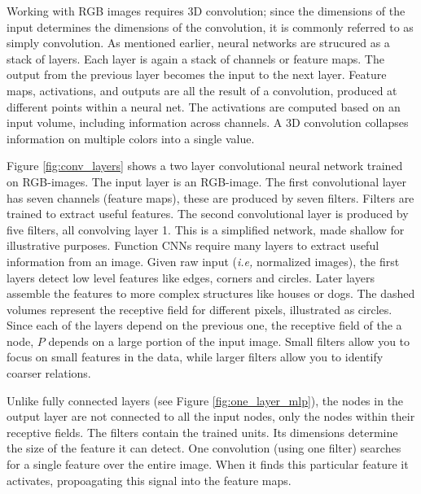 \documentclass{article}
\begin{document}
Working with RGB images requires 3D convolution; since the dimensions of the input determines the dimensions of the convolution, it is commonly referred to as simply convolution. As mentioned earlier, neural networks are strucured as a stack of layers. Each layer is again a stack of channels or feature maps. The output from the previous layer becomes the input to the next layer. Feature maps, activations, and outputs are all the result of a convolution, produced at different points within a neural net. The activations are computed based on an input volume, including information across channels. A 3D convolution collapses information on multiple colors into a single value.

Figure \ref{fig:conv_layers} shows a two layer convolutional neural network trained on RGB-images. The input layer is an RGB-image. The first convolutional layer has seven channels (feature maps), these are produced by seven filters. Filters are trained to extract useful features. The second convolutional layer is produced by five filters, all convolving layer 1. This is a simplified network, made shallow for illustrative purposes. Function CNNs require many layers to extract useful information from an image. %
Given raw input (\textit{i.e,} normalized images), the first layers detect low level features like edges, corners and circles. Later layers assemble the features to more complex structures like houses or dogs. The dashed volumes represent the receptive field for different pixels, illustrated as circles. Since each of the layers depend on the previous one, the receptive field of the a node, $P$ depends on a large portion of the input image. Small filters allow you to focus on small features in the data, while larger filters allow you to identify coarser relations.

Unlike fully connected layers (see Figure \ref{fig:one_layer_mlp}), the nodes in the output layer are not connected to all the input nodes, only the nodes within their receptive fields. The filters contain the trained units. Its dimensions determine the size of the feature it can detect. One convolution (using one filter) searches for a single feature over the entire image. When it finds this particular feature it activates, propoagating this signal into the feature maps.%
\end{document}
